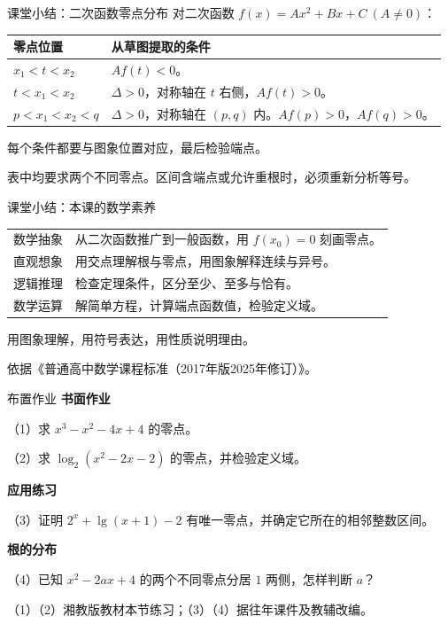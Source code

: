 \documentclass[aspectratio=169,10pt,handout]{beamer}
\newcommand{\src}[1]{\par\vfill{\color{gray}\scriptsize #1}\par}
\newcommand{\gap}{\par\vspace{2mm}}
\begin{document}
\begin{frame}[t]{课堂小结：二次函数零点分布}
  \large
  对二次函数 $f(x)=Ax^2+Bx+C\ (A\ne0)$：
  \begin{tabular}{p{4.2cm}p{8.5cm}}\toprule
    零点位置 & 从草图提取的条件\\\midrule
    $x_1<t<x_2$ & $Af(t)<0$。\\[4mm]
    $t<x_1<x_2$ & $\Delta>0$，对称轴在 $t$ 右侧，$Af(t)>0$。\\[4mm]
    $p<x_1<x_2<q$ & $\Delta>0$，对称轴在 $(p,q)$ 内。\newline $Af(p)>0$，$Af(q)>0$。\\\bottomrule
  \end{tabular}
  \gap 每个条件都要与图象位置对应，最后检验端点。
  \src{表中均要求两个不同零点。区间含端点或允许重根时，必须重新分析等号。}
\end{frame}

\begin{frame}[t]{课堂小结：本课的数学素养}
  \large
  \begin{tabular}{p{2.4cm}p{10.3cm}}\toprule
    数学抽象 & 从二次函数推广到一般函数，用 $f(x_0)=0$ 刻画零点。\\[3mm]
    直观想象 & 用交点理解根与零点，用图象解释连续与异号。\\[3mm]
    逻辑推理 & 检查定理条件，区分至少、至多与恰有。\\[3mm]
    数学运算 & 解简单方程，计算端点函数值，检验定义域。\\\bottomrule
  \end{tabular}
  \gap
  用图象理解，用符号表达，用性质说明理由。
  \src{依据《普通高中数学课程标准（2017年版2025年修订）》。}
\end{frame}

\begin{frame}[t]{布置作业}
  \large
  \textbf{书面作业}
  \par（1）求 $x^3-x^2-4x+4$ 的零点。
  \par（2）求 $\log_2(x^2-2x-2)$ 的零点，并检验定义域。
  \gap
  \textbf{应用练习}
  \par（3）证明 $2^x+\lg(x+1)-2$ 有唯一零点，并确定它所在的相邻整数区间。
  \gap
  \textbf{根的分布}
  \par（4）已知 $x^2-2ax+4$ 的两个不同零点分居 $1$ 两侧，怎样判断 $a$？
  \src{（1）（2）湘教版教材本节练习；（3）（4）据往年课件及教辅改编。}
\end{frame}
\end{document}
